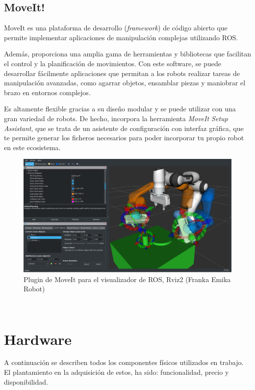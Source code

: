 \subsection{MoveIt!}
\label{subsec:moveit}
\noindent MoveIt es una plataforma de desarrollo (\textit{framework}) de código abierto que permite implementar 
aplicaciones de manipulación complejas utilizando ROS. 

Además, proporciona una amplia gama de herramientas y bibliotecas que 
facilitan el control y la planificación de movimientos. Con este software, se puede desarrollar fácilmente aplicaciones que permitan
a los robots realizar tareas de manipulación avanzadas, como agarrar objetos, ensamblar piezas y maniobrar el brazo en entornos complejos. 

Es altamente flexible gracias a su diseño modular y se puede utilizar con una gran variedad de robots. De hecho, incorpora la herramienta 
\textit{MoveIt Setup Assistant}, que se trata de un asistente de configuración con interfaz gráfica, que te permite generar los ficheros 
necesarios para poder incorporar tu propio robot en este ecosistema. 
\begin{figure} [h!]
  \begin{center}
    \includegraphics[width=14cm]{figs/moveit_intro.png}
  \end{center}
  \caption{Plugin de MoveIt para el visualizador de ROS, Rviz2 (Franka Emika Robot)}
  \label{fig:ros2logo}
\end{figure}\ 

\newpage
\section{Hardware}
\label{sec:hardware}
\noindent A continuación se describen todos los componentes físicos utilizados en trabajo. El plantamiento en la adquisición 
de estos, ha sido: funcionalidad, precio y disponibilidad.

